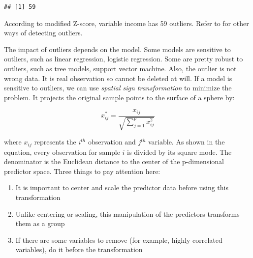 \documentclass[
  12pt,
]{krantz}
\makeatletter
\newenvironment{Shaded}{\begin{snugshade}}{\end{snugshade}}
\newcommand{\CommentTok}[1]{\textcolor[rgb]{0.37,0.37,0.37}{\textit{#1}}}
\newcommand{\FloatTok}[1]{\textcolor[rgb]{0.06,0.06,0.06}{#1}}
\newcommand{\FunctionTok}[1]{\textcolor[rgb]{0,0,0}{#1}}
\newcommand{\NormalTok}[1]{#1}
\newcommand{\OtherTok}[1]{\textcolor[rgb]{0.37,0.37,0.37}{#1}}
\newcommand{\SpecialCharTok}[1]{\textcolor[rgb]{0,0,0}{#1}}
\providecommand{\tightlist}{%
  \setlength{\itemsep}{0pt}\setlength{\parskip}{0pt}}
\newenvironment{kframe}{%
\medskip{}
\setlength{\fboxsep}{.8em}
 \def\at@end@of@kframe{}%
 \ifinner\ifhmode%
  \def\at@end@of@kframe{\end{minipage}}%
  \begin{minipage}{\columnwidth}%
 \fi\fi%
 \def\FrameCommand##1{\hskip\@totalleftmargin \hskip-\fboxsep
 \colorbox{shadecolor}{##1}\hskip-\fboxsep
     \hskip-\linewidth \hskip-\@totalleftmargin \hskip\columnwidth}%
 \MakeFramed {\advance\hsize-\width
   \@totalleftmargin\z@ \linewidth\hsize
   \@setminipage}}%
 {\par\unskip\endMakeFramed%
 \at@end@of@kframe}
\renewenvironment{Shaded}{\begin{kframe}}{\end{kframe}}
\makeatother
\begin{document}
\begin{Shaded}
\end{Shaded}

\begin{verbatim}
## [1] 59
\end{verbatim}

According to modified Z-score, variable income has 59 outliers. Refer to \citep{mad1} for other ways of detecting outliers.

The impact of outliers depends on the model. Some models are sensitive to outliers, such as linear regression, logistic regression. Some are pretty robust to outliers, such as tree models, support vector machine. Also, the outlier is not wrong data. It is real observation so cannot be deleted at will. If a model is sensitive to outliers, we can use \emph{spatial sign transformation} \citep{ssp} to minimize the problem. It projects the original sample points to the surface of a sphere by:

\[x_{ij}^{*}=\frac{x_{ij}}{\sqrt{\sum_{j=1}^{p}x_{ij}^{2}}}\]

where \(x_{ij}\) represents the \(i^{th}\) observation and \(j^{th}\) variable. As shown in the equation, every observation for sample \(i\) is divided by its square mode. The denominator is the Euclidean distance to the center of the p-dimensional predictor space. Three things to pay attention here:

\begin{enumerate}
\def\labelenumi{\arabic{enumi}.}
\tightlist
\item
  It is important to center and scale the predictor data before using this transformation
\item
  Unlike centering or scaling, this manipulation of the predictors transforms them as a group
\item
  If there are some variables to remove (for example, highly correlated variables), do it before the transformation
\end{enumerate}
\end{document}
